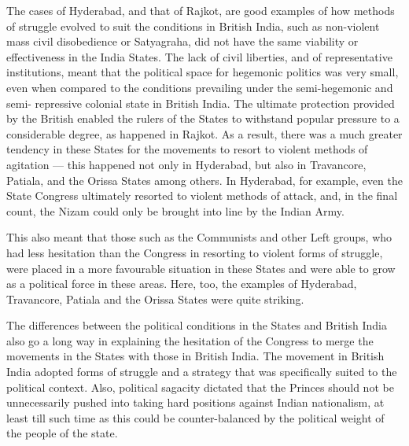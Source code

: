 The cases of Hyderabad, and that of Rajkot, are good examples of how methods of struggle evolved to suit the conditions in British India, such as non-violent mass civil disobedience or Satyagraha, did not have the same viability or effectiveness in the India States. The lack of civil liberties, and of representative institutions, meant that the political space for hegemonic politics was very small, even when compared to the conditions prevailing under the semi-hegemonic and semi- repressive colonial state in British India. The ultimate protection provided by the British enabled the rulers of the States to withstand popular pressure to a considerable degree, as happened in Rajkot. As a result, there was a much greater tendency in these States for the movements to resort to violent methods of agitation — this happened not only in Hyderabad, but also in Travancore, Patiala, and the Orissa States among others. In Hyderabad, for example, even the State Congress ultimately resorted to violent methods of attack, and, in the final count, the Nizam could only be brought into line by the Indian Army. 

This also meant that those such as the Communists and other Left groups, who had less hesitation than the Congress in resorting to violent forms of struggle, were placed in a more favourable situation in these States and were able to grow as a political force in these areas. Here, too, the examples of Hyderabad, Travancore, Patiala and the Orissa States were quite striking. 

The differences between the political conditions in the States and British India also go a long way in explaining the hesitation of the Congress to merge the movements in the States with those in British India. The movement in British India adopted forms of struggle and a strategy that was specifically suited to the political context. Also, political sagacity dictated that the Princes should not be unnecessarily pushed into taking hard positions against Indian nationalism, at least till such time as this could be counter-balanced by the political weight of the people of the state.
